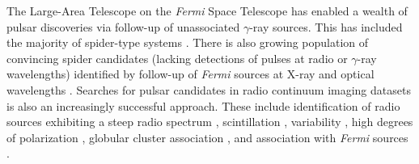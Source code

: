 \documentclass[fleqn,usenatbib]{mnras}
\newcommand{\todo}[1]{\textcolor{red}{TODO: #1}\PackageWarning{TODO:}{#1!}}
\newcommand{\fermi}{\textit{Fermi}}
\begin{document}
The Large-Area Telescope on the \textit{Fermi} Space Telescope \citep[\textit{Fermi}-LAT;][]{2009ApJ...697.1071A} has enabled a wealth of pulsar discoveries via follow-up of unassociated $\gamma$-ray sources. This has included the majority of spider-type systems \citep[e.g., ][]{2013MNRAS.429.1633B,2013ApJ...773L..12B,2015ApJ...810...85C,2016ApJ...819...34C,2023MNRAS.519.5590C, 2023ApJ...943..103A}. There is also growing population of convincing spider candidates (lacking detections of pulses at radio or $\gamma$-ray wavelengths) identified by follow-up of \textit{Fermi} sources at X-ray and optical wavelengths \citep[e.g.][]{2014ApJ...788L..27S, 2015ApJ...813L..26S, 2015ApJ...812L..24R, 2020MNRAS.497.5364B, 2022ApJ...935....2C, 2022Natur.605...41B}.
Searches for pulsar candidates in radio continuum imaging datasets is also an increasingly successful approach. These include identification of radio sources exhibiting a steep radio spectrum \citep{1982Natur.300..615B, 2018MNRAS.475..942F, 2022ApJ...927..216R}, scintillation \citep{2016MNRAS.462.3115D,2017MNRAS.472.1458D}, variability \citep{2022ApJ...930...38W}, high degrees of polarization \citep{2019ApJ...884...96K, 2022A&A...661A..87S}, globular cluster association \citep{2023MNRAS.525L..76H}, and association with \textit{Fermi} sources \citep{2018MNRAS.475..942F}. 


\end{document}
